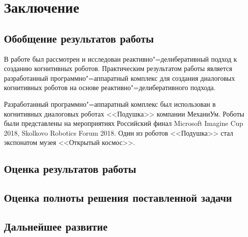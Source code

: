 \chapter{Заключение}
\section{Обобщение результатов работы}
В работе был рассмотрен и исследован реактивно"=делиберативный подход к созданию когнитивных роботов. Практическим результатом работы является разработанный программно"=аппаратный комплекс для создания диалоговых когнитивных роботов на основе реактивно"=делиберативного подхода. 

Разработанный программно"=аппаратный комплекс был использован в когнитивных диалоговых роботах <<Подушка>> компании МеханиУм. Роботы были представлены на мероприятиях Российский финал Microsoft Imagine Cup 2018, Skolkovo Robotics Forum 2018. Один из роботов <<Подушка>> стал экспонатом музея <<Открытый космос>>. 
\section{Оценка результатов работы}
\section{Оценка полноты решения поставленной задачи}
\section{Дальнейшее развитие}
